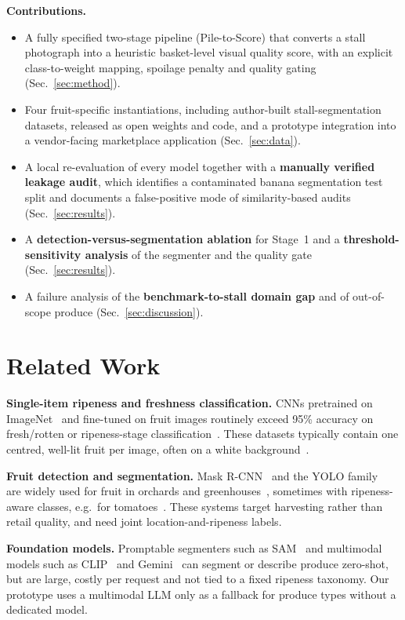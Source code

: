 \documentclass[10pt,twocolumn]{article}
\begin{document}
\noindent\textbf{Contributions.}
\begin{itemize}
  \item A fully specified two-stage pipeline (Pile-to-Score) that converts a stall photograph into a heuristic basket-level visual quality score, with an explicit class-to-weight mapping, spoilage penalty and quality gating (Sec.~\ref{sec:method}).
  \item Four fruit-specific instantiations, including author-built stall-segmentation datasets, released as open weights and code, and a prototype integration into a vendor-facing marketplace application (Sec.~\ref{sec:data}).
  \item A local re-evaluation of every model together with a \textbf{manually verified leakage audit}, which identifies a contaminated banana segmentation test split and documents a false-positive mode of similarity-based audits (Sec.~\ref{sec:results}).
  \item A \textbf{detection-versus-segmentation ablation} for Stage~1 and a \textbf{threshold-sensitivity analysis} of the segmenter and the quality gate (Sec.~\ref{sec:results}).
  \item A failure analysis of the \textbf{benchmark-to-stall domain gap} and of out-of-scope produce (Sec.~\ref{sec:discussion}).
\end{itemize}

\section{Related Work}
\textbf{Single-item ripeness and freshness classification.} CNNs pretrained on ImageNet~\cite{deng2009} and fine-tuned on fruit images routinely exceed 95\% accuracy on fresh/rotten or ripeness-stage classification~\cite{muresan2018,bird2022,kamilaris2018}. These datasets typically contain one centred, well-lit fruit per image, often on a white background~\cite{vegnet}.

\textbf{Fruit detection and segmentation.} Mask R-CNN~\cite{he2017maskrcnn} and the YOLO family~\cite{redmon2016yolo,jocher2023yolov8} are widely used for fruit in orchards and greenhouses~\cite{sa2016,bargoti2017,koirala2019}, sometimes with ripeness-aware classes, e.g.\ for tomatoes~\cite{liu2020yolotomato,laboro2020}. These systems target harvesting rather than retail quality, and need joint location-and-ripeness labels.

\textbf{Foundation models.} Promptable segmenters such as SAM~\cite{kirillov2023sam} and multimodal models such as CLIP~\cite{radford2021clip} and Gemini~\cite{gemini2023} can segment or describe produce zero-shot, but are large, costly per request and not tied to a fixed ripeness taxonomy. Our prototype uses a multimodal LLM only as a fallback for produce types without a dedicated model.
\end{document}
